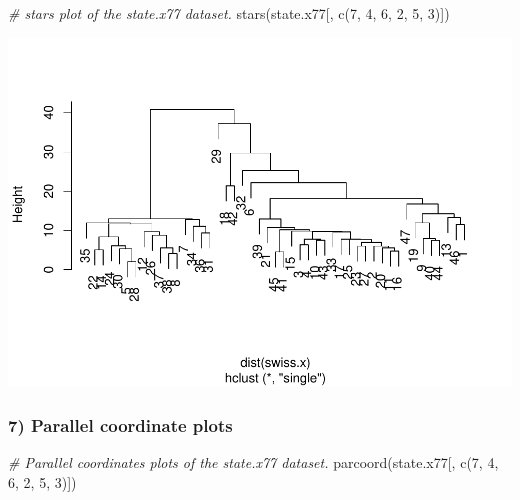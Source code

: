 \documentclass[
]{article}
\newenvironment{Shaded}{\begin{snugshade}}{\end{snugshade}}
\newcommand{\CommentTok}[1]{\textcolor[rgb]{0.56,0.35,0.01}{\textit{#1}}}
\newcommand{\DecValTok}[1]{\textcolor[rgb]{0.00,0.00,0.81}{#1}}
\newcommand{\FunctionTok}[1]{\textcolor[rgb]{0.00,0.00,0.00}{#1}}
\newcommand{\NormalTok}[1]{#1}
\begin{document}
\begin{Shaded}
\begin{Highlighting}[]
\CommentTok{\# stars plot of the state.x77 dataset.}
\FunctionTok{stars}\NormalTok{(state.x77[, }\FunctionTok{c}\NormalTok{(}\DecValTok{7}\NormalTok{, }\DecValTok{4}\NormalTok{, }\DecValTok{6}\NormalTok{, }\DecValTok{2}\NormalTok{, }\DecValTok{5}\NormalTok{, }\DecValTok{3}\NormalTok{)])}
\end{Highlighting}
\end{Shaded}

\includegraphics{modern_applied_statistics_CH11_files/figure-latex/unnamed-chunk-15-1.pdf}

\newpage

\hypertarget{parallel-coordinate-plots}{%
\subsubsection{7) Parallel coordinate
plots}\label{parallel-coordinate-plots}}

\begin{Shaded}
\begin{Highlighting}[]
\CommentTok{\# Parallel coordinates plots of the state.x77 dataset.}
\FunctionTok{parcoord}\NormalTok{(state.x77[, }\FunctionTok{c}\NormalTok{(}\DecValTok{7}\NormalTok{, }\DecValTok{4}\NormalTok{, }\DecValTok{6}\NormalTok{, }\DecValTok{2}\NormalTok{, }\DecValTok{5}\NormalTok{, }\DecValTok{3}\NormalTok{)])}
\end{Highlighting}
\end{Shaded}
\end{document}
